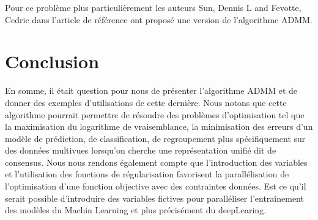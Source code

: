 \documentclass[12pt,a4paper]{report}
\begin{document}
            	Pour ce problème plus particulièrement les auteurs Sun, Dennis L and Fevotte, Cedric dans l'article de référence \cite{sun2014alternating} ont proposé une version de l'algorithme ADMM.
           	 
\section{Conclusion}
	En somme, il était question pour nous de présenter l'algorithme ADMM et de donner des exemples d'utilisations de cette dernière.
	Nous notons que cette algorithme pourrait permettre de résoudre des problèmes d'optimisation tel que la maximisation du logarithme de vraisemblance, la minimisation des erreurs d'un modèle de prédiction, de classification, de regroupement plus spécifiquement sur des données multivues lorsqu'on cherche une représentation unifié dit de consensus.
	Nous nous rendons également compte que l'introduction des variables et l'utilisation des fonctions de régularisation favorisent la parallélisation de l'optimisation d'une fonction objective avec des contraintes données.
	Est ce qu'il serait possible d'introduire des variables fictives pour paralléliser l'entraînement des modèles du Machin Learning et plus précisément du deepLearing.
   	 
   	 

\end{document}

